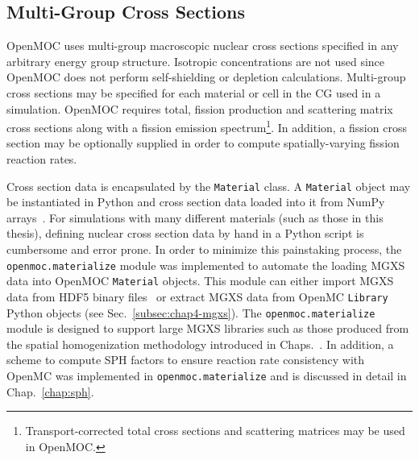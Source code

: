 
\subsection{Multi-Group Cross Sections}
\label{subsubsec:chap4-openmoc-mgxs}

OpenMOC uses multi-group macroscopic nuclear cross sections specified in any arbitrary energy group structure. Isotropic concentrations are not used since OpenMOC does not perform self-shielding or depletion calculations. Multi-group cross sections may be specified for each material or cell in the \ac{CG} used in a simulation. OpenMOC requires total, fission production and scattering matrix cross sections along with a fission emission spectrum\footnote{Transport-corrected total cross sections and scattering matrices may be used in OpenMOC.}. In addition, a fission cross section may be optionally supplied in order to compute spatially-varying fission reaction rates.

Cross section data is encapsulated by the \texttt{Material} class. A \texttt{Material} object may be instantiated in Python and cross section data loaded into it from NumPy arrays~\cite{walt2011numpy}. For simulations with many different materials (such as those in this thesis), defining nuclear cross section data by hand in a Python script is cumbersome and error prone. In order to minimize this painstaking process, the \texttt{openmoc.materialize} module was implemented to automate the loading \ac{MGXS} data into OpenMOC \texttt{Material} objects. This module can either import \ac{MGXS} data from HDF5 binary files~\cite{koranne2011hdf5} or extract \ac{MGXS} data from OpenMC \texttt{Library} Python objects (see Sec.~\ref{subsec:chap4-mgxs}). The \texttt{openmoc.materialize} module is designed to support large \ac{MGXS} libraries such as those produced from the spatial homogenization methodology introduced in Chaps.~. In addition, a scheme to compute \ac{SPH} factors to ensure reaction rate consistency with OpenMC was implemented in \texttt{openmoc.materialize} and is discussed in detail in Chap.~\ref{chap:sph}.

